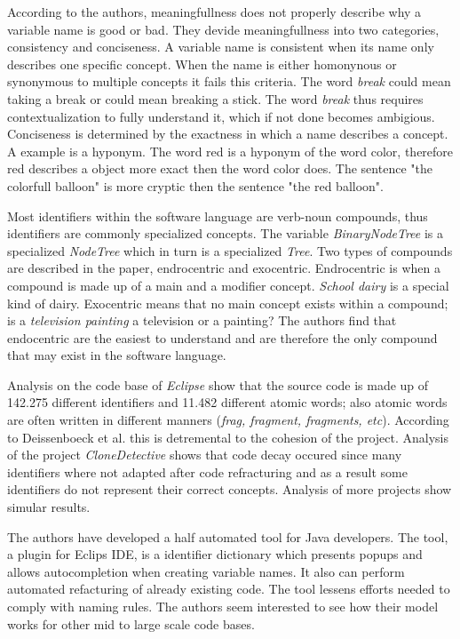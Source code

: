 \documentclass[a4paper,12pt]{article}
\begin{document}
According to the authors, meaningfullness does not properly describe why a variable name is good or bad. They devide meaningfullness into two categories, consistency and conciseness. A variable name is consistent when its name only describes one specific concept. When the name is either homonynous or synonymous to multiple concepts it fails this criteria. The word \textit{break} could mean taking a break or could mean breaking a stick. The word \textit{break} thus requires contextualization to fully understand it, which if not done becomes ambigious. Conciseness is determined by the exactness in which a name describes a concept. A example is a hyponym. The word red is a hyponym of the word color, therefore red describes a object more exact then the word color does. The sentence "the colorfull balloon" is more cryptic then the sentence "the red balloon".

Most identifiers within the software language are verb-noun compounds, thus identifiers are commonly specialized concepts. The variable \textit{BinaryNodeTree} is a specialized \textit{NodeTree} which in turn is a specialized \textit{Tree}. Two types of compounds are described in the paper, endrocentric and exocentric. Endrocentric is when a compound is made up of a main and a modifier concept. \textit{School dairy} is a special kind of dairy. Exocentric means that no main concept exists within a compound; is a \textit{television painting} a television or a painting? The authors find that endocentric are the easiest to understand and are therefore the only compound that may exist in the software language.

Analysis on the code base of \textit{Eclipse} show that the source code is made up of 142.275 different identifiers and 11.482 different atomic words; also atomic words are often written in different manners (\textit{frag, fragment, fragments, etc}). According to Deissenboeck et al. this is detremental to the cohesion of the project. Analysis of the project \textit{CloneDetective} shows that code decay occured since many identifiers where not adapted after code refracturing and as a result some identifiers do not represent their correct concepts. Analysis of more projects show simular results.

The authors have developed a half automated tool for Java developers. The tool, a plugin for Eclips IDE, is a identifier dictionary which presents popups and allows autocompletion when creating variable names. It also can perform automated refacturing of already existing code. The tool lessens efforts needed to comply with naming rules. The authors seem interested to see how their model works for other mid to large scale code bases.
\end{document}

